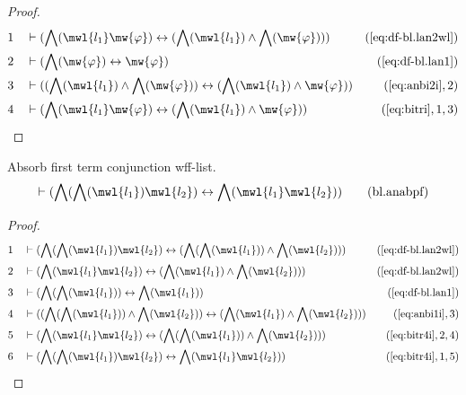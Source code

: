 \begin{proof}
\begin{align}
  1 &&  & \vdash ( \bigwedge( \mwl{l_1} \mw{\varphi} ) \leftrightarrow ( \bigwedge( \mwl{l_1} ) \wedge \bigwedge( \mw{\varphi} ) ) )&(\mbox{\ref{eq:df-bl.lan2wl}})\notag
  \\ 2 &&  & \vdash ( \bigwedge( \mw{\varphi} ) \leftrightarrow \mw{\varphi} )&(\mbox{\ref{eq:df-bl.lan1}})\notag
  \\ 3 &&  & \vdash ( ( \bigwedge( \mwl{l_1} ) \wedge \bigwedge( \mw{\varphi} ) ) \leftrightarrow ( \bigwedge( \mwl{l_1} ) \wedge \mw{\varphi} ) )&(\mbox{\ref{eq:anbi2i}},2)\notag
  \\ 4 &&  & \vdash ( \bigwedge( \mwl{l_1} \mw{\varphi} ) \leftrightarrow ( \bigwedge( \mwl{l_1} ) \wedge \mw{\varphi} ) )&(\mbox{\ref{eq:bitri}},1,3)\notag
\end{align}
\end{proof}

\begin{lemma} Absorb first term conjunction wff-list.
\begin{align}
\vdash ( \bigwedge( \bigwedge( \mwl{l_1} ) \mwl{l_2} ) \leftrightarrow
    \bigwedge( \mwl{l_1} \mwl{l_2} ) )\label{eq:bl.anabpf}\tag{bl.anabpf}
\end{align}
\end{lemma}

\begin{proof}
\begin{align}
  1 &&  & \vdash ( \bigwedge( \bigwedge( \mwl{l_1} ) \mwl{l_2} ) \leftrightarrow ( \bigwedge( \bigwedge( \mwl{l_1} ) ) \wedge \bigwedge( \mwl{l_2} ) ) )&(\mbox{\ref{eq:df-bl.lan2wl}})\notag
  \\ 2 &&  & \vdash ( \bigwedge( \mwl{l_1} \mwl{l_2} ) \leftrightarrow ( \bigwedge( \mwl{l_1} ) \wedge \bigwedge( \mwl{l_2} ) ) )&(\mbox{\ref{eq:df-bl.lan2wl}})\notag
  \\ 3 &&  & \vdash ( \bigwedge( \bigwedge( \mwl{l_1} ) ) \leftrightarrow \bigwedge( \mwl{l_1} ) )&(\mbox{\ref{eq:df-bl.lan1}})\notag
  \\ 4 &&  & \vdash ( ( \bigwedge( \bigwedge( \mwl{l_1} ) ) \wedge \bigwedge( \mwl{l_2} ) ) \leftrightarrow ( \bigwedge( \mwl{l_1} ) \wedge \bigwedge( \mwl{l_2} ) ) )&(\mbox{\ref{eq:anbi1i}},3)\notag
  \\ 5 &&  & \vdash ( \bigwedge( \mwl{l_1} \mwl{l_2} ) \leftrightarrow ( \bigwedge( \bigwedge( \mwl{l_1} ) ) \wedge \bigwedge( \mwl{l_2} ) ) )&(\mbox{\ref{eq:bitr4i}},2,4)\notag
  \\ 6 &&  & \vdash ( \bigwedge( \bigwedge( \mwl{l_1} ) \mwl{l_2} ) \leftrightarrow \bigwedge( \mwl{l_1} \mwl{l_2} ) )&(\mbox{\ref{eq:bitr4i}},1,5)\notag
\end{align}
\end{proof}

